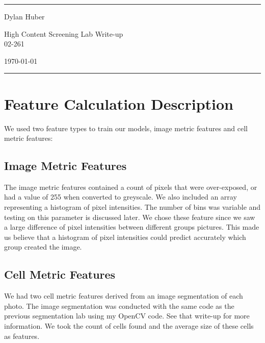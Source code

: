 \documentclass[a4paper]{article}
\begin{document}

\fancyhead[C]{}
\hrule \medskip %
\begin{minipage}{0.295\textwidth} 
\raggedright
\footnotesize
Dylan Huber 
\end{minipage}
\begin{minipage}{0.4\textwidth} 
\centering 
\large 
High Content Screening Lab Write-up\\ 
\normalsize 
02-261\\ 
\end{minipage}
\begin{minipage}{0.295\textwidth} 
\raggedleft
\today\hfill\\
\end{minipage}
\medskip\hrule 
\bigskip


\section{Feature Calculation Description}

We used two feature types to train our models, image metric features and cell metric features:

\subsection{Image Metric Features}

The image metric features contained a count of pixels that were over-exposed, or had a value of 255 when converted to greyscale. We also included an array representing a histogram of pixel intensities. The number of bins was variable and testing on this parameter is discussed later. We chose these feature since we saw a large difference of pixel intensities between different groups pictures. This made us believe that a histogram of pixel intensities could predict accurately which group created the image.

\subsection{Cell Metric Features}

We had two cell metric features derived from an image segmentation of each photo. The image segmentation was conducted with the same code as the previous segmentation lab using my OpenCV code. See that write-up for more information. We took the count of cells found and the average size of these cells as features.
\end{document}
